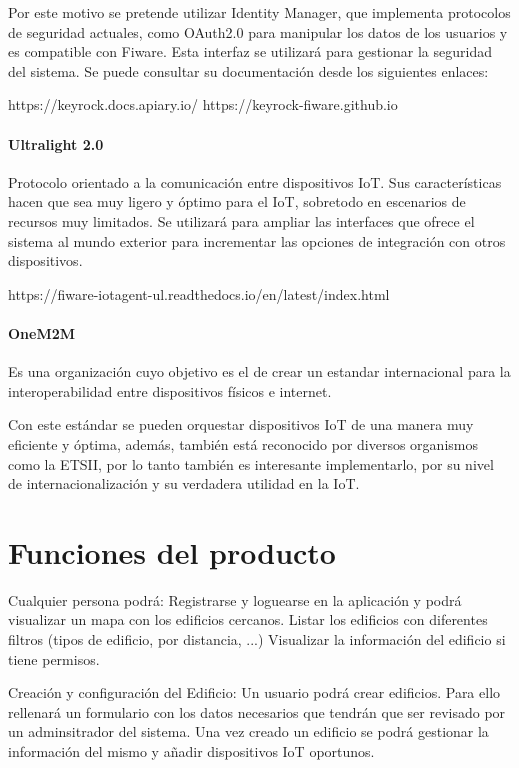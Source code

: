 \documentclass[12pt, a4paper, twoside]{article}
\begin{document}
Por este motivo se pretende utilizar Identity Manager, que implementa protocolos de seguridad
actuales, como OAuth2.0 para manipular los datos de los usuarios y es compatible con Fiware.
Esta interfaz se utilizará para gestionar la seguridad del sistema.
Se puede consultar su documentación desde los siguientes enlaces: 

https://keyrock.docs.apiary.io/
https://keyrock-fiware.github.io
\paragraph{Ultralight 2.0}
Protocolo orientado a la comunicación entre dispositivos IoT.
Sus características hacen que sea muy ligero y óptimo para el IoT, sobretodo
en escenarios de recursos muy limitados.
Se utilizará para ampliar las interfaces que ofrece el sistema al mundo exterior
para incrementar las opciones de integración con otros dispositivos.

https://fiware-iotagent-ul.readthedocs.io/en/latest/index.html

\paragraph{OneM2M}
Es una organización cuyo objetivo es el de crear un estandar internacional para la interoperabilidad
entre dispositivos físicos e internet.

Con este estándar se pueden orquestar dispositivos IoT de una manera muy eficiente y óptima, además,
también está reconocido por diversos organismos como la ETSII, por lo tanto también es interesante
implementarlo, por su nivel de internacionalización y su verdadera utilidad en la IoT.

\section{Funciones del producto}
Cualquier persona podrá:
 Registrarse y loguearse en la aplicación y podrá visualizar un mapa con los edificios cercanos.
 Listar los edificios con diferentes filtros (tipos de edificio, por distancia, ...)
 Visualizar la información del edificio si tiene permisos.

Creación y configuración del Edificio:
 Un usuario podrá crear edificios. Para ello rellenará un formulario con los datos necesarios que
 tendrán que ser revisado por un adminsitrador del sistema.
 Una vez creado un edificio se podrá gestionar la información del mismo y añadir dispositivos IoT oportunos.
\end{document}
